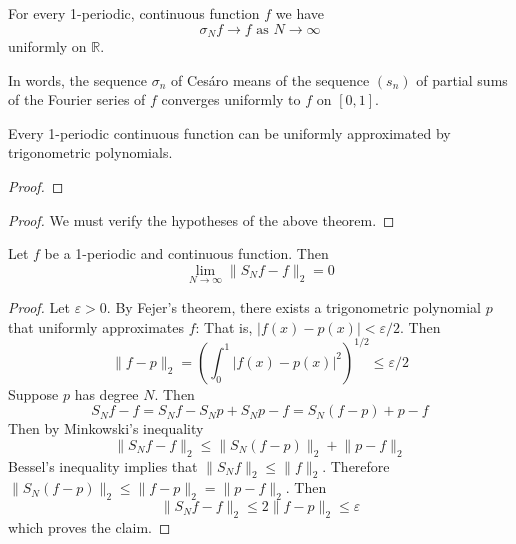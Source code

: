 \documentclass[11pt]{article}
\numberwithin{equation}{section}
\theoremstyle{definition}
\theoremstyle{definition}
\newcommand\parens[1]{\left( #1 \right)}
\newcommand\abs[1]{\left| #1 \right|}
\newcommand\norm[1]{\lVert#1\rVert}
\newcommand{\1}{\mathbbm 1}
\newcommand{\e}{\varepsilon}
\newcommand{\RR}{\mathbb R}
\begin{document}
\begin{theorem}[Fej\'er]
	For every 1-periodic, continuous function $f$ we have
	\begin{equation}
		\sigma_N f \to f \text{ as } N \to \infty
	\end{equation}
	uniformly on $\RR$. 

	In words, the sequence $\sigma_n$ of Ces\'aro means of the sequence $(s_n)$ of partial sums of the Fourier series of $f$ converges uniformly to $f$ on $[0,1]$.
\end{theorem}

\begin{corollary}
	Every 1-periodic continuous function can be uniformly approximated by trigonometric polynomials. 
\end{corollary}
\begin{proof}
	
\end{proof}



\begin{corollary}

\end{corollary}
\begin{proof}
	We must verify the hypotheses of the above theorem. 

\end{proof}

\begin{theorem}
	Let $f$ be a 1-periodic and continuous function. Then
	\begin{equation}
		\lim_{N \to \infty} \norm{S_N f - f}_2 = 0
	\end{equation}
\end{theorem}
\begin{proof}
	Let $\e > 0$. By Fejer's theorem, there exists a trigonometric polynomial $p$ that uniformly approximates $f$: That is, $|f(x) - p(x)| < \e/2$. Then
	\begin{equation}
		\norm{f - p}_2 = \parens{\int_0^1 \abs{f(x)-p(x)}^2}^{1/2} \leq \e/2
	\end{equation}
	Suppose $p$ has degree $N$. Then 
	\begin{equation}
		S_N f - f = S_N f - S_N p + S_N p - f = S_N (f - p) + p - f
	\end{equation}
	Then by Minkowski's inequality
	\begin{equation}
		\norm{S_N f - f}_2 \leq \norm{S_N (f - p)}_2 + \norm{p - f}_2
	\end{equation}
	Bessel's inequality implies that $\norm{S_N f}_2 \leq \norm{f}_2$. Therefore $\norm{S_N (f-p)}_2 \leq \norm{f-p}_2 = \norm{p-f}_2$. Then
	\begin{equation}
		\norm{S_N f - f}_2 \leq 2 \norm{f-p}_2 \leq \e
	\end{equation}
	which proves the claim. 	
\end{proof}
\end{document}

